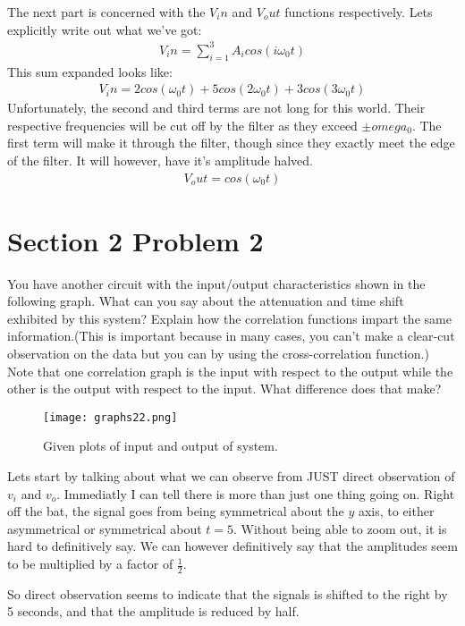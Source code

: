 \documentclass{article}
\begin{document}
The next part is concerned with the $V_in$ and $V_out$ functions respectively. Lets explicitly write out what we've got:
\begin{align*}
V_in = \sum_{i=1}^{3} A_i cos(i \omega_0 t)
\end{align*}
This sum expanded looks like:
\begin{align*}
\boxed{ V_in = 2 cos(\omega_0 t) + 5 cos(2 \omega_0 t) + 3 cos(3 \omega_0 t) }
\end{align*}
Unfortunately, the second and third terms are not long for this world. Their respective frequencies will be cut off by the filter as they exceed $\pm omega_0$. The first term will make it through the filter, though since they exactly meet the edge of the filter. It will however, have it's amplitude halved.
\begin{align*}
\boxed{ V_out = cos(\omega_0 t) }
\end{align*}

\pagebreak
\section*{Section 2 Problem 2}
You have another circuit with the input/output characteristics shown in the following graph. What can you say about the attenuation and time shift exhibited by this system? Explain how the correlation functions impart the same information.(This is important because in many cases, you can’t make a clear-cut observation on the data but you can by using the cross-correlation function.) Note that one correlation graph is the input with respect to the output while the other is the output with respect to the input. What difference does that make?
\begin{figure}[hbt!]

\centering
\texttt{[image: graphs22.png]}
\caption{Given plots of input and output of system.}\label{fig:Q42Plot}
\end{figure}
Lets start by talking about what we can observe from JUST direct observation of $v_i$ and $v_o$. Immediatly I can tell there is more than just one thing going on. Right off the bat, the signal goes from being symmetrical about the $y$ axis, to either asymmetrical or symmetrical about $t=5$. Without being able to zoom out, it is hard to definitively say. We can however definitively say that the amplitudes seem to be multiplied by a factor of $\frac{1}{2}$. 

So direct observation seems to indicate that the signals is shifted to the right by 5 seconds, and that the amplitude is reduced by half.
\end{document}
